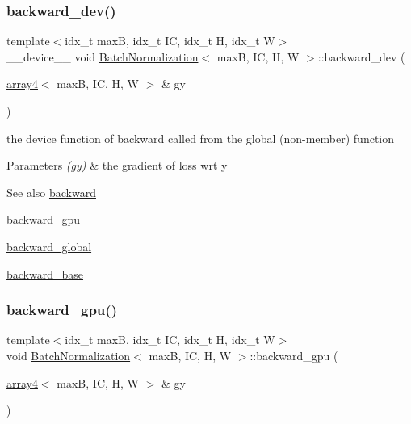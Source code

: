 \subsubsection{\texorpdfstring{backward\+\_\+dev()}{backward\_dev()}}
{\footnotesize\ttfamily template$<$idx\+\_\+t maxB, idx\+\_\+t IC, idx\+\_\+t H, idx\+\_\+t W$>$ \\
\+\_\+\+\_\+device\+\_\+\+\_\+ void \hyperlink{structBatchNormalization}{Batch\+Normalization}$<$ maxB, IC, H, W $>$\+::backward\+\_\+dev (\begin{DoxyParamCaption}\item[{\hyperlink{structarray4}{array4}$<$ maxB, IC, H, W $>$ \&}]{gy }\end{DoxyParamCaption})\hspace{0.3cm}{\ttfamily [inline]}}



the device function of backward called from the global (non-\/member) function 


\begin{DoxyParams}{Parameters}
{\em (gy)} & the gradient of loss wrt y \\
\hline
\end{DoxyParams}
\begin{DoxySeeAlso}{See also}
\hyperlink{structBatchNormalization_a3b6d987026effdc6c3a2c99e54ae58f9}{backward} 

\hyperlink{structBatchNormalization_a2a80a633ecc4a5ed378dd0ff70d275e1}{backward\+\_\+gpu} 

\hyperlink{softmaxcrossentropy_8h_a47d56a9a23e08247b227f4aac17413e0}{backward\+\_\+global} 

\hyperlink{structBatchNormalization_a0ef45335c50151f68de03d33b1d226ca}{backward\+\_\+base} 
\end{DoxySeeAlso}
\mbox{\label{structBatchNormalization_a2a80a633ecc4a5ed378dd0ff70d275e1}} 
\subsubsection{\texorpdfstring{backward\+\_\+gpu()}{backward\_gpu()}}
{\footnotesize\ttfamily template$<$idx\+\_\+t maxB, idx\+\_\+t IC, idx\+\_\+t H, idx\+\_\+t W$>$ \\
void \hyperlink{structBatchNormalization}{Batch\+Normalization}$<$ maxB, IC, H, W $>$\+::backward\+\_\+gpu (\begin{DoxyParamCaption}\item[{\hyperlink{structarray4}{array4}$<$ maxB, IC, H, W $>$ \&}]{gy }\end{DoxyParamCaption})\hspace{0.3cm}{\ttfamily [inline]}}



